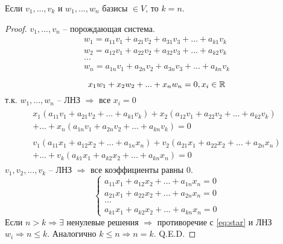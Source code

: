 \begin{theorem}
    Если $v_1, ..., v_k$ и $w_1, ...,w_n$ базисы $\in V$, то $k=n$.
\end{theorem}
\begin{proof}
    $v_1, ..., v_n$ -- порождающая система.
    \begin{gather*}
        w_1 = a_{11} v_1 + a_{21} v_2  + a_{31} v_3 + ... + a_{k1} v_k \\
        w_2 = a_{12} v_1 + a_{22} v_2  + a_{32} v_3 + ... + a_{k2} v_k \\
        ...                                                            \\
        w_n = a_{1n} v_1 + a_{2n} v_2  + a_{3n} v_3 + ... + a_{kn} v_k \\
    \end{gather*}
    \begin{equation}\label{eq:star}
        x_1 w_1 + x_2 w_2 + ... + x_n w_n = 0, x_i \in \mathbb{R}
    \end{equation}
    т.к. $w_1, ..., w_n$ -- ЛНЗ $\Rightarrow$ все $x_i=0$
    \begin{gather*}
        \begin{multlined}
            x_1 (a_{11} v_1 + a_{21} v_2 + ... + a_{k1} v_k) +
            x_2 (a_{12} v_1 + a_{22} v_2 + ... + a_{k2} v_k) \\
            + ... +
            x_n (a_{1n} v_1 + a_{2n} v_2 + ... + a_{kn} v_k) = 0
        \end{multlined}\\
        \begin{multlined}
            v_1 (a_{11} x_1 + a_{12} x_2 + ... + a_{1n} x_n ) +
            v_2 (a_{21} x_1 + a_{22} x_2 + ... + a_{2n} x_n ) \\
            + ... +
            v_k (a_{k1} x_1 + a_{k2} x_2 + ... + a_{kn} x_n ) = 0
        \end{multlined}
    \end{gather*}
    $v_1, v_2, ..., v_k$ -- ЛНЗ $\Rightarrow$ все коэффициенты равны 0.
    \[\begin{cases}
            a_{11} x_1 + a_{12} x_2 + ... + a_{1n}x_n = 0 \\
            a_{21} x_1 + a_{22} x_2 + ... + a_{2n}x_n = 0 \\
            ...                                           \\
            a_{k1} x_1 + a_{k2} x_2 + ... + a_{kn}x_n = 0
        \end{cases}\]
    Если $n>k \Rightarrow \exists$ ненулевые решения $\Rightarrow$ противоречие
    с \eqref{eq:star} и ЛНЗ $w_i \Rightarrow n \le k$. Аналогично $k \le n \Rightarrow n=k$. Q.E.D.
\end{proof}